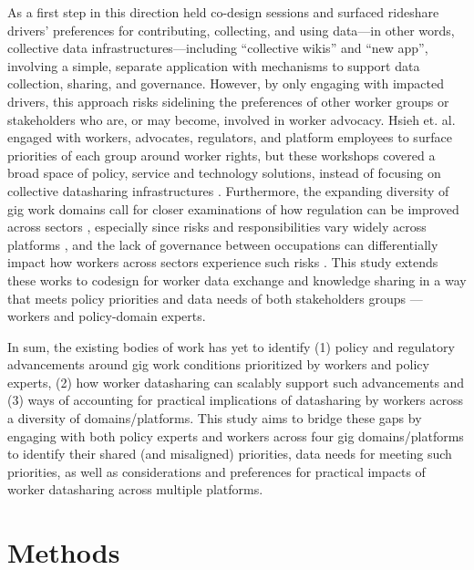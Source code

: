 As a first step in this direction \citet{uuapp} held co-design sessions and surfaced rideshare drivers' {preferences for contributing, collecting, and using data---in other words, }collective data infrastructures---including ``collective wikis'' and ``new app'', {involving a simple, separate application with mechanisms }to support data collection, sharing, and governance. However, {by only engaging with impacted drivers}, {this approach risks sidelining the preferences of} other worker groups or stakeholders {who are, or may become,} involved in worker advocacy. Hsieh et. al. {engaged with workers,} advocates, regulators, and platform employees {to surface} priorities {of each group} around worker rights, {but these workshops covered a broad space of policy, service and technology solutions, instead of focusing on} collective datasharing infrastructures \cite{codesign}. 
{Furthermore, the expanding diversity of gig work domains call for closer examinations of how regulation can be improved across sectors \cite{individualized}, especially since risks and responsibilities vary widely across platforms \cite{privacy}, and the lack of governance between occupations can differentially impact how workers across sectors experience such risks \cite{disruption, mastracci2016breaking, basu2015health}.}
This study extends these works to codesign for worker data exchange and knowledge sharing in a way that meets policy priorities and data needs of both stakeholders groups --- workers and policy-domain experts.


In sum, the existing bodies of work has yet to identify (1) policy and regulatory advancements around gig work conditions prioritized by workers and policy experts, (2) how worker datasharing can scalably support such advancements and (3) ways of accounting for practical implications of 
datasharing by workers across a diversity of domains/platforms. This study aims to bridge these gaps by engaging with both policy experts and workers across four gig domains/platforms to identify their shared (and misaligned) priorities, data needs for meeting such priorities, as well as considerations and preferences for practical impacts of worker datasharing across multiple platforms.

\section{Methods}

